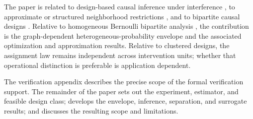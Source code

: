 The paper is related to design-based causal inference under interference \citep{HudgensHalloran2008,AronowSamii2017GeneralInterference,SavjeAronowHudgens2021}, to approximate or structured neighborhood restrictions \citep{Leung2019ApproxNeighborhoodInterference}, and to bipartite causal designs \citep{ZiglerPapadogeorgou2018,ChattopadhyayImaiZubizarreta2023GeneralizedNetwork}. Relative to homogeneous Bernoulli bipartite analysis \citep{LuShiFangZhangDing2025BipartiteDesign}, the contribution is the graph-dependent heterogeneous-probability envelope and the associated optimization and approximation results. Relative to clustered designs, the assignment law remains independent across intervention units; whether that operational distinction is preferable is application dependent.

The verification appendix describes the precise scope of the formal verification support. The remainder of the paper sets out the experiment, estimator, and feasible design class; develops the envelope, inference, separation, and surrogate results; and discusses the resulting scope and limitations.
